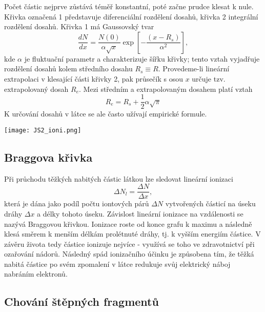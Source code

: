 \documentclass[../../main.tex]{subfiles}
\begin{document}
Počet částic nejprve zůstává téměř konstantní, poté začne prudce klesat k nule. Křivka označená 1 představuje diferenciální rozdělení dosahů, křivka 2 integrální rozdělení dosahů. Křivka 1 má Gaussovský tvar
\begin{equation}
\dfrac{dN}{dx} = \dfrac{N(0)}{\alpha \sqrt{x}} \exp \left[- \dfrac{(x-R_s)}{\alpha^2} \right] ,
\end{equation}
kde $\alpha$ je fluktuační parametr a charakterizuje šířku křivky; tento vztah vyjadřuje rozdělení dosahů kolem středního dosahu $R_s \equiv R$. Provedeme-li lineární extrapolaci v klesající části křivky 2, pak průsečík s osou $x$ určuje tzv. extrapolovaný dosah $R_e$. Mezi středním a extrapolovaným dosahem platí vztah 
\begin{equation}
R_e = R_s + \dfrac{1}{2} \alpha \sqrt{\pi}
\end{equation}
K určování dosahů v látce se ale často užívají empirické formule.

\begin{center}
	\texttt{[image: JS2\_ioni.png]}
\end{center}

\subsection{Braggova křivka}

Při průchodu těžkých nabitých částic látkou lze sledovat lineární ionizaci
\begin{equation}
\Delta N_l = \dfrac{\Delta N}{\Delta x},
\end{equation}
která je dána jako podíl počtu iontových párů $\Delta N$ vytvořených částicí na úseku dráhy $\Delta x$ a délky tohoto úseku. Závislost lineární ionizace na vzdálenosti se nazývá Braggovou křivkou. Ionizace roste od konce grafu k maximu a následně klesá směrem k menším délkám prolétnuté dráhy, tj. k vyšším energiím částice. V závěru života tedy částice ionizuje nejvíce - využívá se toho ve zdravotnictví při ozařování nádorů. Následný spád ionizačního účinku je způsobena tím, že těžká nabitá částice po svém zpomalení v látce redukuje svůj elektrický náboj nabráním elektronů.

\subsection{Chování štěpných fragmentů}
\end{document}
